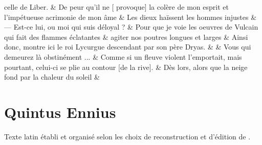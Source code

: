 \documentclass[12pt,onecolumn,twoside,a4paper]{memoir}
\begin{document}
\begin{pairs}
\begin{Rightside}
                              celle de Liber. \&
                         \stanza 
                     De peur qu’il ne [ provoque] la colère de mon esprit et l’impétueuse
                              acrimonie de mon âme  \&
                         \stanza Les dieux haïssent les hommes injustes &
                     — Est-ce lui, ou moi qui suis déloyal ? \&
                         \stanza 
                     Pour que je voie les oeuvres de Vulcain qui fait des flammes
                              éclatantes  \&
                         \stanza 
                     agiter nos poutres longues et larges \&
                         \stanza Ainsi donc, montre ici le roi Lycurgue descendant par son père
                              Dryas. &
                      \&
                         \stanza 
                     Vous qui demeurez là obstinément ... \&
                         \stanza 
                     Comme si un fleuve violent l’emportait, mais pourtant, celui-ci se
                              plie au contour [de la rive]. \&
                         \stanza 
                     Dès lors, alors que la neige fond par la chaleur du soleil \&
                     
                  \endnumbering
		\end{Rightside}
               \end{pairs}
	\Columns
            
         
         
            \section{Quintus Ennius}
            Texte latin établi et organisé selon les choix de reconstruction et d'édition de \cite{EnniusLoeb}.\par
            
\end{document}
